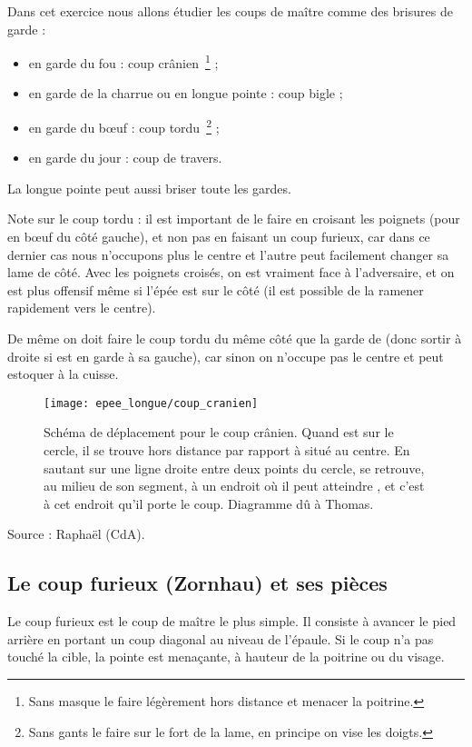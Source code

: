 \begin{exercice}
Dans cet exercice nous allons étudier les coups de maître comme des brisures de garde :
\begin{itemize}
	\item \D en garde du fou : coup crânien~\footnote{Sans masque le faire légèrement hors distance et menacer la poitrine.} ;
	\item \D en garde de la charrue ou en longue pointe : coup bigle ;
	\item \D en garde du bœuf : coup tordu~\footnote{Sans gants le faire sur le fort de la lame, en principe on vise les doigts.} ;
	\item \D en garde du jour : coup de travers.
\end{itemize}
La longue pointe peut aussi briser toute les gardes.

Note sur le coup tordu : il est important de le faire en croisant les poignets (pour \D en bœuf du côté gauche), et non pas en faisant un coup furieux, car dans ce dernier cas nous n'occupons plus le centre et l'autre peut facilement changer sa lame de côté. Avec les poignets croisés, on est vraiment face à l'adversaire, et on est plus offensif même si l'épée est sur le côté (il est possible de la ramener rapidement vers le centre).

De même on doit faire le coup tordu du même côté que la garde de \D (donc sortir à droite si \D est en garde à sa gauche), car sinon on n'occupe pas le centre et \D peut estoquer à la cuisse.

\begin{figure}[ht]
	\centering
	\texttt{[image: epee\_longue/coup\_cranien]}
	\caption{Schéma de déplacement pour le coup crânien. Quand \A est sur le cercle, il se trouve hors distance par rapport à \D situé au centre. En sautant sur une ligne droite entre deux points du cercle, \A se retrouve, au milieu de son segment, à un endroit où il peut atteindre \D, et c'est à cet endroit qu'il porte le coup. Diagramme dû à Thomas.}
\end{figure}

Source : Raphaël (CdA).
\end{exercice}

\subsection{Le coup furieux (Zornhau) et ses pièces}

\begin{definition}
Le coup furieux est le coup de maître le plus simple.
Il consiste à avancer le pied arrière en portant un coup diagonal au niveau de l'épaule.
Si le coup n'a pas touché la cible, la pointe est menaçante, à hauteur de la poitrine ou du visage.
\end{definition}

